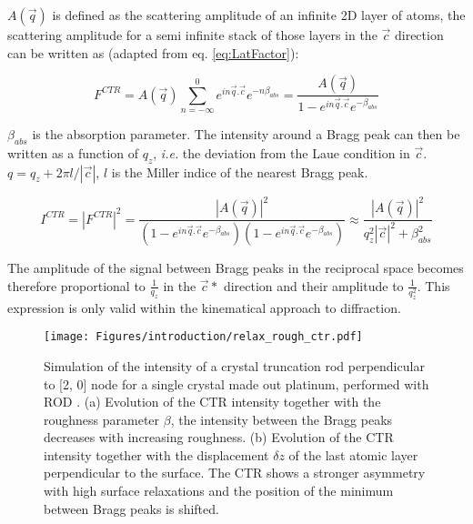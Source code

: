 $A(\vec{q})$ is defined as the scattering amplitude of an infinite 2D layer of atoms, the scattering amplitude for a semi infinite stack of those layers in the $\vec{c}$ direction can be written as (adapted from eq. \ref{eq:LatFactor}):

\begin{equation}
    \label{eq:CTR1}
    F^{CTR} = A(\vec{q})\sum_{n=-\infty}^0 e^{in\vec{q}.\vec{c}} e^{-n\beta_{abs}} = \frac{A(\vec{q})}{1 - e^{in\vec{q}.\vec{c}} e^{-\beta_{abs}}}
\end{equation}

$\beta_{abs}$ is the absorption parameter.
The intensity around a Bragg peak can then be written as a function of $q_z$, \textit{i.e.} the deviation from the Laue condition in $\vec{c}$.
$q = q_z + 2\pi l/|\vec{c}|$, $l$ is the Miller indice of the nearest Bragg peak.

\begin{equation}
    \label{eq:CTR2}
    I^{CTR} = |F^{CTR}|^2 = \frac{|A(\vec{q})|^2}{(1 - e^{in\vec{q}.\vec{c}} e^{-\beta_{abs}})(1 - e^{in\vec{q}.\vec{c}} e^{-\beta_{abs}})} \approx \frac{|A(\vec{q})|^2}{q_z^2 |\vec{c}|^2 + \beta_{abs}^2 }
\end{equation}

The amplitude of the signal between Bragg peaks in the reciprocal space becomes therefore proportional to $\frac{1}{q_z}$ in the $\vec{c}*$ direction and their amplitude to $\frac{1}{q_z^2}$.
This expression is only valid within the kinematical approach to diffraction.

\begin{figure}[!htb]
    \centering
    \texttt{[image: Figures/introduction/relax\_rough\_ctr.pdf]}
    \caption{
    Simulation of the intensity of a crystal truncation rod perpendicular to [2, 0] node for a single crystal made out platinum, performed with ROD \parencite{Vlieg2000}.
    (a) Evolution of the CTR intensity together with the roughness parameter $\beta$, the intensity between the Bragg peaks decreases with increasing roughness.
    (b) Evolution of the CTR intensity together with the displacement $\delta z$ of the last atomic layer perpendicular to the surface.
    The CTR shows a stronger asymmetry with high surface relaxations and the position of the minimum between Bragg peaks is shifted.
    }
    \label{fig:CTRSimulation}
\end{figure}


